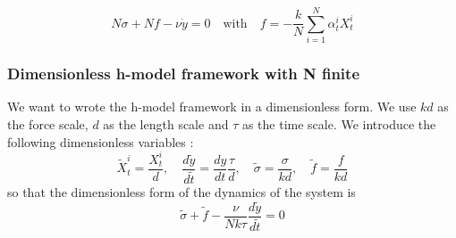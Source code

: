 \documentclass{article}
\begin{document}
\begin{equation}
    N \sigma + N f - \nu \dot{y} = 0 \quad \text{with} \quad f = -\frac{k}{N} \sum_{i=1}^N \alpha_t^i X_t^i
\end{equation}
\subsubsection{ Dimensionless h-model framework with N finite}

We want to wrote the h-model framework in a dimensionless form. We use $kd$ as the force scale, $d$ as the length scale and $\tau$ as the time scale. We introduce the following dimensionless variables :
\begin{equation}
    \tilde{X}_t^i = \frac{X_t^i}{d}, \quad \frac{d\tilde{y}}{d\tilde{t}} = \frac{dy}{dt}\frac{\tau}{d}, \quad \tilde{\sigma} = \frac{\sigma}{kd}, \quad \tilde{f} = \frac{f}{kd}
\end{equation}
so that the dimensionless form of the dynamics of the system is
\begin{equation}
    \tilde{\sigma} + \tilde{f} - \frac{\nu}{Nk\tau} \frac{d\tilde{y}}{d\tilde{t}} = 0
\end{equation}
\end{document}
